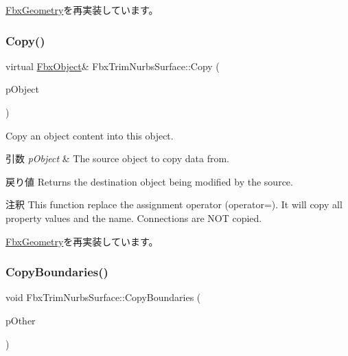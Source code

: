 \hyperlink{class_fbx_geometry_a26ca96a86f17783c45ff83b33d2b5324}{Fbx\+Geometry}を再実装しています。

\mbox{\label{class_fbx_trim_nurbs_surface_a4407d30e83346ab3cb30ccf67d7bb289}} 
\subsubsection{\texorpdfstring{Copy()}{Copy()}}
{\footnotesize\ttfamily virtual \hyperlink{class_fbx_object}{Fbx\+Object}\& Fbx\+Trim\+Nurbs\+Surface\+::\+Copy (\begin{DoxyParamCaption}\item[{const \hyperlink{class_fbx_object}{Fbx\+Object} \&}]{p\+Object }\end{DoxyParamCaption})\hspace{0.3cm}{\ttfamily [virtual]}}

Copy an object content into this object. 
\begin{DoxyParams}{引数}
{\em p\+Object} & The source object to copy data from. \\
\hline
\end{DoxyParams}
\begin{DoxyReturn}{戻り値}
Returns the destination object being modified by the source. 
\end{DoxyReturn}
\begin{DoxyRemark}{注釈}
This function replace the assignment operator (operator=). It will copy all property values and the name. Connections are N\+OT copied. 
\end{DoxyRemark}


\hyperlink{class_fbx_geometry_aac1cee4251e3d5fbd27f1181c58b83b3}{Fbx\+Geometry}を再実装しています。

\mbox{\label{class_fbx_trim_nurbs_surface_a7d8f23447e1286c7d8476ece0561c923}} 
\subsubsection{\texorpdfstring{Copy\+Boundaries()}{CopyBoundaries()}}
{\footnotesize\ttfamily void Fbx\+Trim\+Nurbs\+Surface\+::\+Copy\+Boundaries (\begin{DoxyParamCaption}\item[{\hyperlink{class_fbx_trim_nurbs_surface}{Fbx\+Trim\+Nurbs\+Surface} const \&}]{p\+Other }\end{DoxyParamCaption})}

